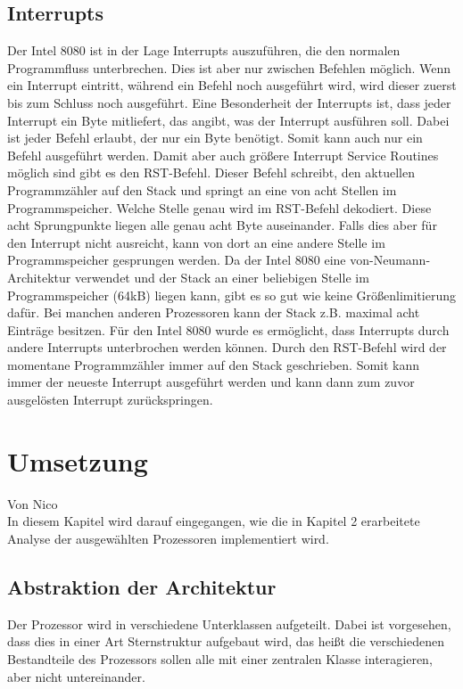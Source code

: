 \documentclass[12pt]{article}
\begin{document}
\subsection{Interrupts}
Der Intel 8080 ist in der Lage Interrupts auszuführen, die den normalen Programmfluss unterbrechen. Dies ist aber nur zwischen Befehlen möglich. Wenn ein Interrupt eintritt, während ein Befehl noch ausgeführt wird, wird dieser zuerst bis zum Schluss noch ausgeführt. Eine Besonderheit der Interrupts ist, dass jeder Interrupt ein Byte mitliefert, das angibt, was der Interrupt ausführen soll. Dabei ist jeder Befehl erlaubt, der nur ein Byte benötigt. Somit kann auch nur ein Befehl ausgeführt werden. Damit aber auch größere Interrupt Service Routines möglich sind gibt es den RST-Befehl. Dieser Befehl schreibt, den aktuellen Programmzähler auf den Stack und springt an eine von acht Stellen im Programmspeicher. Welche Stelle genau wird im RST-Befehl dekodiert. Diese acht Sprungpunkte liegen alle genau acht Byte auseinander. Falls dies aber für den Interrupt nicht ausreicht, kann von dort an eine andere Stelle im Programmspeicher gesprungen werden. Da der Intel 8080 eine von-Neumann-Architektur verwendet und der Stack an einer beliebigen Stelle im Programmspeicher (64kB) liegen kann, gibt es so gut wie keine Größenlimitierung dafür. Bei manchen anderen Prozessoren kann der Stack z.B. maximal acht Einträge besitzen. Für den Intel 8080 wurde es ermöglicht, dass Interrupts durch andere Interrupts unterbrochen werden können. Durch den RST-Befehl wird der momentane Programmzähler immer auf den Stack geschrieben. Somit kann immer der neueste Interrupt ausgeführt werden und kann dann zum zuvor ausgelösten Interrupt zurückspringen.


\newpage

\section{Umsetzung}
Von Nico\\

\noindent
In diesem Kapitel wird darauf eingegangen, wie die in Kapitel 2 erarbeitete Analyse der ausgewählten Prozessoren implementiert wird.

\subsection{Abstraktion der Architektur}
Der Prozessor wird in verschiedene Unterklassen aufgeteilt. Dabei ist vorgesehen, dass dies in einer Art Sternstruktur aufgebaut wird, das heißt die verschiedenen Bestandteile des Prozessors sollen alle mit einer zentralen Klasse interagieren, aber nicht untereinander.
\end{document}
